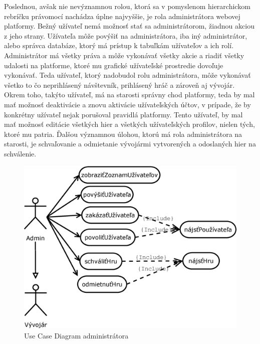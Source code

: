 Poslednou, avšak nie nevýznamnou rolou, ktorá sa v pomyslenom hierarchickom rebríčku právomocí nachádza úplne najvyššie, je rola administrátora webovej platformy. Bežný užívateľ nemá možnosť stať sa administrátorom, žiadnou akciou z jeho strany. Užívateľa môže povýšiť na administrátora, iba iný administrátor, alebo správca databáze, ktorý má prístup k tabuľkám užívateľov a ich rolí. Administrátor má všetky práva a môže vykonávať všetky akcie a riadiť všetky udalosti na platforme, ktoré mu grafické užívateľské prostredie dovoľuje vykonávať. Teda užívateľ, ktorý nadobudol rolu administrátora, môže vykonávať všetko to čo neprihlásený návštevník, prihlásený hráč a zároveň aj vývojár. Okrem toho, takýto užívateľ, má na starosti správny chod platformy, teda by mal mať možnosť deaktivácie a znovu aktivácie užívateľských účtov, v prípade, že by konkrétny užívateľ nejak porušoval pravidlá platformy. Tento užívateľ, by mal mať možnosť editácie všetkých hier a všetkých užívateľských profilov, nielen tých, ktoré mu patria. Ďalšou významnou úlohou, ktorú má rola administrátora na starosti, je schvaľovanie a odmietanie vývojármi vytvorených a odoslaných hier na schválenie.
\begin{figure}[h]
  \centering
  \includegraphics[scale=0.40]{fig/ucd-admin.eps}
  \caption{Use Case Diagram administrátora}
  \label{fig:ucdadmin}
\end{figure}

